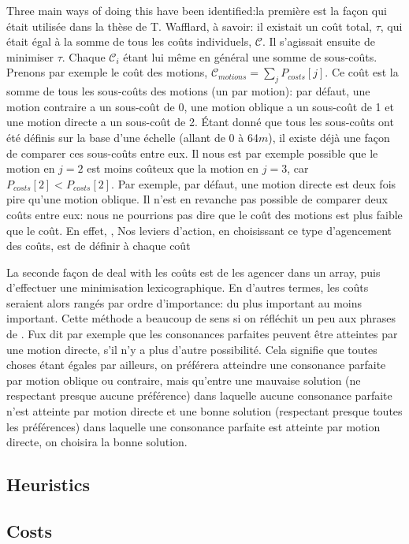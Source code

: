 Three main ways of doing this have been identified:la première est la façon qui était utilisée dans la thèse de T. Wafflard, à savoir: il existait un coût total, $\tau$, qui était égal à la somme de tous les coûts individuels, $\mathcal{C}$. Il s'agissait ensuite de minimiser $\tau$. Chaque $\mathcal{C}_i$ étant lui même en général une somme de sous-coûts. Prenons par exemple le coût des motions, $\mathcal{C}_{motions} = \sum_j P_{costs}[j] $. Ce coût est la somme de tous les sous-coûts des motions (un par motion): par défaut, une motion contraire a un sous-coût de 0, une motion oblique a un sous-coût de 1 et une motion directe a un sous-coût de 2. Étant donné que tous les sous-coûts ont été définis sur la base d'une échelle (allant de 0 à 64$m$), il existe déjà une façon de comparer ces sous-coûts entre eux. Il nous est par exemple possible que le motion en $j=2$ est moins coûteux que la motion en $j=3$, car $P_{costs}[2] < P_{costs}[2]$. Par exemple, par défaut, une motion directe est deux fois pire qu'une motion oblique. Il n'est en revanche pas possible de comparer deux coûts entre eux: nous ne pourrions pas dire que le coût des motions est plus faible que le coût. En effet, ,  Nos leviers d'action, en choisissant ce type d'agencement des coûts, est de définir à chaque coût 

La seconde façon de deal with les coûts est de les agencer dans un array, puis d'effectuer une minimisation lexicographique. En d'autres termes, les coûts seraient alors rangés par ordre d'importance: du plus important au moins important. Cette méthode a beaucoup de sens si on réfléchit un peu aux phrases de \gap. Fux dit par exemple que les consonances parfaites peuvent être atteintes par une motion directe, s'il n'y a plus d'autre possibilité. Cela signifie que toutes choses étant égales par ailleurs, on préférera atteindre une consonance parfaite par motion oblique ou contraire, mais qu'entre une mauvaise solution (ne respectant presque aucune préférence) dans laquelle aucune consonance parfaite n'est atteinte par motion directe et une bonne solution (respectant presque toutes les préférences) dans laquelle une consonance parfaite est atteinte par motion directe, on choisira la bonne solution. 

\subsection{Heuristics}

\subsection{Costs} \label{costs}